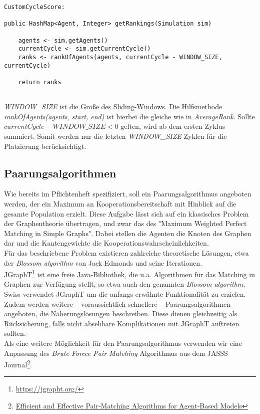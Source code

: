 \begin{lstlisting}
CustomCycleScore:

public HashMap<Agent, Integer> getRankings(Simulation sim) 
	
	agents <- sim.getAgents()
	currentCycle <- sim.getCurrentCycle()
	ranks <- rankOfAgents(agents, currentCycle - WINDOW_SIZE, currentCycle)
	
	return ranks
	
\end{lstlisting}
\emph{WINDOW\_SIZE} ist die Größe des Sliding-Windows. Die Hilfsmethode \emph{rankOfAgents(agents, start, end)} ist hierbei die gleiche wie in \emph{AverageRank}. Sollte $currentCycle - WINDOW\_SIZE < 0$ gelten, wird ab dem ersten Zyklus summiert. Somit werden nur die letzten \emph{WINDOW\_SIZE} Zyklen für die Platzierung berücksichtigt. 


\subsection{Paarungsalgorithmen}

Wie bereits im Pflichtenheft spezifiziert, soll ein Paarungsalgorithmus angeboten werden, der ein Maximum an Kooperationsbereitschaft mit Hinblick auf die gesamte Population erzielt. Diese Aufgabe lässt sich auf ein klassisches Problem der Graphentheorie übertragen, und zwar das des "Maximum Weighted Perfect Matching in Simple Graphs". Dabei stellen die Agenten die Knoten des Graphen dar und die Kantengewichte die Kooperationswahrscheinlichkeiten.\\
Für das beschriebene Problem existieren zahlreiche theoretische Lösungen, etwa der \emph{Blossom algorithm} von Jack Edmonds und seine Iterationen.\\
JGraphT\footnote{\href{https://jgrapht.org/}{https://jgrapht.org/}} ist eine freie Java-Bibliothek, die u.a. Algorithmen für das Matching in Graphen zur Verfügung stellt, so etwa auch den genannten \emph{Blossom algorithm}.\\
Swiss verwendet JGraphT um die anfangs erwähnte Funktionalität zu erzielen. Zudem werden weitere – voraussichtlich schnellere – Paarungsalgorithmen angeboten, die Näherungslösungen beschreiben. Diese dienen gleichzeitig als Rücksicherung, falls nicht absehbare Komplikationen mit JGraphT auftreten sollten.
\\

Als eine weitere Möglichkeit für den Paarungsalgorithmus verwenden wir eine Anpassung des \emph{Brute Forece Pair Matching} Algorithmus aus dem JASSS Journal\footnote{\href{http://jasss.soc.surrey.ac.uk/20/4/8.html}{Efficient and Effective Pair-Matching Algorithms for Agent-Based Models}}.

